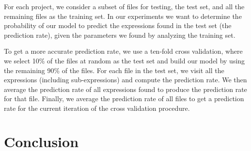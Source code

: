 \documentclass{article} %
\begin{document}
For each project, we consider a subset of files for testing, the test set, and all the remaining files as the training set.
In our experiments we want to determine the probability of our model to predict the expressions found in the test set (the prediction rate), given the parameters we found by analyzing the training set.

To get a more accurate prediction rate, we use a ten-fold cross validation, where we select 10\% of the files at random as the test set and build our model by using the remaining 90\% of the files. For each file in the test set, we visit all the expressions (including sub-expressions) and compute the prediction rate. We then average the prediction rate of all expressions found to produce the prediction rate for that file. Finally, we average the prediction rate of all files to get a prediction rate for the current iteration of the cross validation procedure.

\section*{Conclusion}



\end{document}
